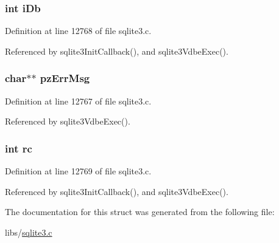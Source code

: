 \subsubsection[{i\+Db}]{\setlength{\rightskip}{0pt plus 5cm}int i\+Db}\label{struct_init_data_ad5da55f1bf334f91b2f63a6a63be348b}


Definition at line 12768 of file sqlite3.\+c.



Referenced by sqlite3\+Init\+Callback(), and sqlite3\+Vdbe\+Exec().

\hypertarget{struct_init_data_ad89b7fe8878cfda3ea65d2a13c77d546}{}
\subsubsection[{pz\+Err\+Msg}]{\setlength{\rightskip}{0pt plus 5cm}char$\ast$$\ast$ pz\+Err\+Msg}\label{struct_init_data_ad89b7fe8878cfda3ea65d2a13c77d546}


Definition at line 12767 of file sqlite3.\+c.



Referenced by sqlite3\+Vdbe\+Exec().

\hypertarget{struct_init_data_ac6509c6fe4cbf7bde170597172f8a288}{}
\subsubsection[{rc}]{\setlength{\rightskip}{0pt plus 5cm}int rc}\label{struct_init_data_ac6509c6fe4cbf7bde170597172f8a288}


Definition at line 12769 of file sqlite3.\+c.



Referenced by sqlite3\+Init\+Callback(), and sqlite3\+Vdbe\+Exec().



The documentation for this struct was generated from the following file\+:\begin{DoxyCompactItemize}
\item 
libs/\hyperlink{sqlite3_8c}{sqlite3.\+c}\end{DoxyCompactItemize}
